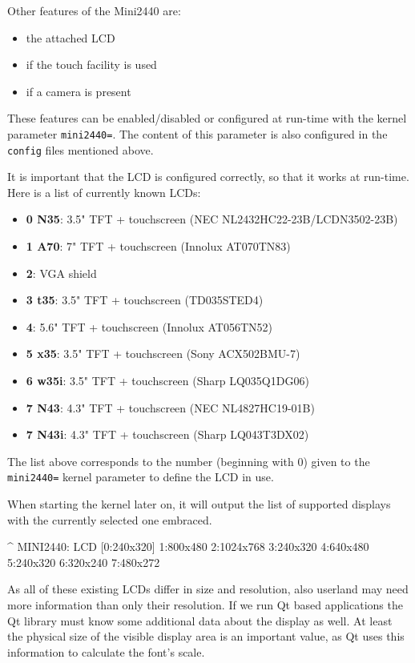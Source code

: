 Other features of the Mini2440 are:

\begin{itemize}
 \item the attached LCD
 \item if the touch facility is used
 \item if a camera is present
\end{itemize}

These features can be enabled/disabled or configured at run-time with the kernel
parameter \texttt{mini2440=}. The content of this parameter is also configured
in the \texttt{config} files mentioned above.

It is important that the LCD is configured correctly, so that it works at
run-time. Here is a list of currently known LCDs:

\begin{itemize}
 \item \textbf{0 N35}: 3.5" TFT + touchscreen (NEC NL2432HC22-23B/LCDN3502-23B)
 \item \textbf{1 A70}: 7" TFT + touchscreen (Innolux AT070TN83)
 \item \textbf{2}: VGA shield
 \item \textbf{3 t35}: 3.5" TFT + touchscreen (TD035STED4)
 \item \textbf{4}: 5.6" TFT + touchscreen (Innolux AT056TN52)
 \item \textbf{5 x35}: 3.5" TFT + touchscreen (Sony ACX502BMU-7)
 \item \textbf{6 w35i}: 3.5" TFT + touchscreen (Sharp LQ035Q1DG06)
 \item \textbf{7 N43}: 4.3" TFT + touchscreen (NEC NL4827HC19-01B)
 \item \textbf{7 N43i}: 4.3" TFT + touchscreen (Sharp LQ043T3DX02)
\end{itemize}

The list above corresponds to the number (beginning with 0) given to the
\texttt{mini2440=} kernel parameter to define the LCD in use.

When starting the kernel later on, it will output the list of supported displays
with the currently selected one embraced.

\begin{ptxshell}[escapechar=|]{^}
MINI2440: LCD [0:240x320] 1:800x480 2:1024x768 3:240x320 4:640x480 5:240x320 6:320x240 7:480x272
\end{ptxshell}

As all of these existing LCDs differ in size and resolution, also userland may
need more information than only their resolution. If we run Qt based applications
the Qt library must know some additional data about the display as well. At
least the physical size of the visible display area is an important value, as
Qt uses this information to calculate the font's scale.

